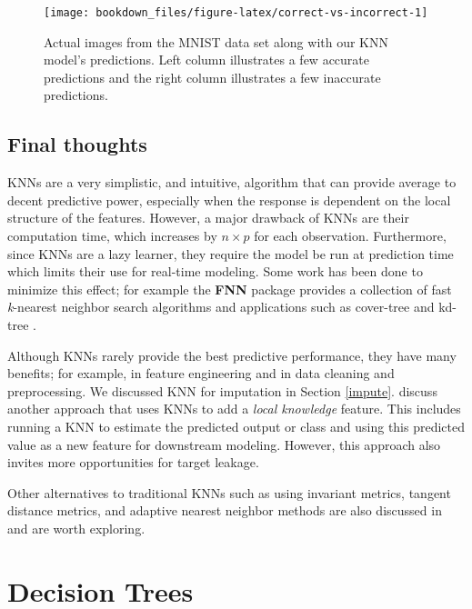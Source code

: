\documentclass[]{krantz}
\begin{document}
\begin{figure}

{\centering \texttt{[image: bookdown\_files/figure-latex/correct-vs-incorrect-1]} 

}

\caption{Actual images from the MNIST data set along with our KNN model's predictions.  Left column illustrates a few accurate predictions and the right column illustrates a few inaccurate predictions.}\label{fig:correct-vs-incorrect}
\end{figure}

\hypertarget{final-thoughts-4}{%
\section{Final thoughts}\label{final-thoughts-4}}

KNNs are a very simplistic, and intuitive, algorithm that can provide average to decent predictive power, especially when the response is dependent on the local structure of the features. However, a major drawback of KNNs are their computation time, which increases by \(n \times p\) for each observation. Furthermore, since KNNs are a lazy learner, they require the model be run at prediction time which limits their use for real-time modeling. Some work has been done to minimize this effect; for example the \textbf{FNN} package \citep{R-fnn} provides a collection of fast \emph{k}-nearest neighbor search algorithms and applications such as cover-tree \citep{beygelzimer2006cover} and kd-tree \citep{robinson1981kdb}.

Although KNNs rarely provide the best predictive performance, they have many benefits; for example, in feature engineering and in data cleaning and preprocessing. We discussed KNN for imputation in Section \ref{impute}. \citet{bruce2017practical} discuss another approach that uses KNNs to add a \emph{local knowledge} feature. This includes running a KNN to estimate the predicted output or class and using this predicted value as a new feature for downstream modeling. However, this approach also invites more opportunities for target leakage.

Other alternatives to traditional KNNs such as using invariant metrics, tangent distance metrics, and adaptive nearest neighbor methods are also discussed in \citet{esl} and are worth exploring.

\hypertarget{DT}{%
\chapter{Decision Trees}\label{DT}}
\end{document}
